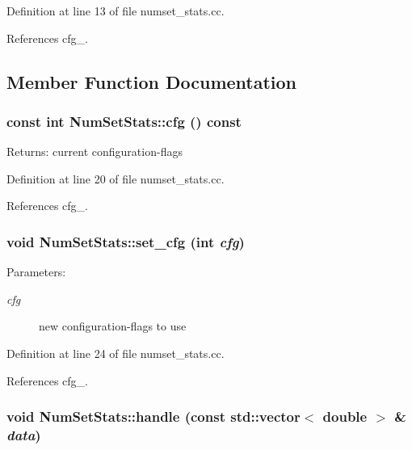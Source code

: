 Definition at line 13 of file numset\_\-stats.cc.

References cfg\_\-.

\subsection{Member Function Documentation}
\hypertarget{class_num_set_stats_93c7b65ee1d6b2b618cf6d4fff0909ee}{
\subsubsection[cfg]{\setlength{\rightskip}{0pt plus 5cm}const int NumSetStats::cfg () const}}
\label{class_num_set_stats_93c7b65ee1d6b2b618cf6d4fff0909ee}


\begin{Desc}
\item[Returns:]current configuration-flags \end{Desc}


Definition at line 20 of file numset\_\-stats.cc.

References cfg\_\-.\hypertarget{class_num_set_stats_6306db6c6b350053c548421871ff9599}{
\subsubsection[set\_\-cfg]{\setlength{\rightskip}{0pt plus 5cm}void NumSetStats::set\_\-cfg (int {\em cfg})}}
\label{class_num_set_stats_6306db6c6b350053c548421871ff9599}


\begin{Desc}
\item[Parameters:]
\begin{description}
\item[{\em cfg}]new configuration-flags to use \end{description}
\end{Desc}


Definition at line 24 of file numset\_\-stats.cc.

References cfg\_\-.\hypertarget{class_num_set_stats_097be7d38f92b8618f9c5f5e8e86d07b}{
\subsubsection[handle]{\setlength{\rightskip}{0pt plus 5cm}void NumSetStats::handle (const std::vector$<$ double $>$ \& {\em data})}}
\label{class_num_set_stats_097be7d38f92b8618f9c5f5e8e86d07b}


